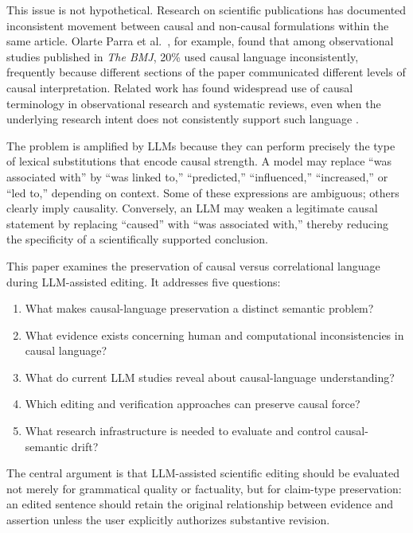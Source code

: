 \documentclass[11pt]{article}
\begin{document}
This issue is not hypothetical. Research on scientific publications has documented inconsistent movement between causal and non-causal formulations within the same article. Olarte Parra et al.~\cite{olarteparra2021}, for example, found that among observational studies published in \textit{The BMJ}, 20\% used causal language inconsistently, frequently because different sections of the paper communicated different levels of causal interpretation. Related work has found widespread use of causal terminology in observational research and systematic reviews, even when the underlying research intent does not consistently support such language \cite{han2020,olarteparra2022}.

The problem is amplified by LLMs because they can perform precisely the type of lexical substitutions that encode causal strength. A model may replace ``was associated with'' by ``was linked to,'' ``predicted,'' ``influenced,'' ``increased,'' or ``led to,'' depending on context. Some of these expressions are ambiguous; others clearly imply causality. Conversely, an LLM may weaken a legitimate causal statement by replacing ``caused'' with ``was associated with,'' thereby reducing the specificity of a scientifically supported conclusion.

This paper examines the preservation of causal versus correlational language during LLM-assisted editing. It addresses five questions:

\begin{enumerate}
  \item What makes causal-language preservation a distinct semantic problem?
  \item What evidence exists concerning human and computational inconsistencies in causal language?
  \item What do current LLM studies reveal about causal-language understanding?
  \item Which editing and verification approaches can preserve causal force?
  \item What research infrastructure is needed to evaluate and control causal-semantic drift?
\end{enumerate}

The central argument is that LLM-assisted scientific editing should be evaluated not merely for grammatical quality or factuality, but for claim-type preservation: an edited sentence should retain the original relationship between evidence and assertion unless the user explicitly authorizes substantive revision.
\end{document}
